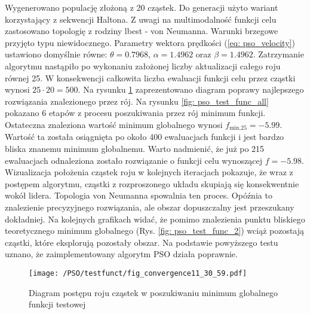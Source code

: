 Wygenerowano populację złożoną z 20 cząstek. Do generacji użyto wariant korzystający z sekwencji Haltona. Z uwagi na multimodalność funkcji celu zastosowano topologię z rodziny lbest - von Neumanna. Warunki brzegowe przyjęto typu niewidocznego. Parametry wektora prędkości (\ref{eq: pso_velocity}) ustawiono domyślnie równe: $\theta=0.7968$, $\alpha=1.4962$ oraz $\beta=1.4962$. Zatrzymanie algorytmu nastąpiło po wykonaniu założonej liczby aktualizacji całego roju równej 25. W konsekwencji całkowita liczba ewaluacji funkcji celu przez cząstki wynosi $25\cdot20=500$. Na rysunku \ref{fig: pso_convergence_plot} zaprezentowano diagram poprawy najlepszego rozwiązania znalezionego przez rój. Na rysunku \ref{fig: pso_test_func_all} pokazano 6 etapów z procesu poszukiwania przez rój minimum funkcji. Ostateczna znaleziona wartość minimum globalnego wynosi $f_{\text{min,25}}=-5.99$. Wartość ta została osiągnięta po około 400 ewaluacjach funkcji i jest bardzo bliska znanemu minimum globalnemu. Warto nadmienić, że już po 215 ewaluacjach odnaleziona zostało rozwiązanie o funkcji celu wynoszącej $f=-5.98$. Wizualizacja położenia cząstek roju w kolejnych iteracjach pokazuje, że wraz z postępem algorytmu, cząstki z rozproszonego układu skupiają się konsekwentnie wokół lidera. Topologia von Neumanna spowalnia ten proces. Opóźnia to znalezienie precyzyjnego rozwiązania, ale obszar dopuszczalny jest przeszukany dokładniej. Na kolejnych grafikach widać, że pomimo znalezienia punktu bliskiego teoretycznego minimum globalnego (Rys. \ref{fig: pso_test_func_2}) wciąż pozostają cząstki, które eksplorują pozostały obszar. Na podstawie powyższego testu uznano, że zaimplementowany algorytm PSO działa poprawnie.
\begin{figure}[h]
	\centering
	\texttt{[image: /PSO/testfunct/fig\_convergence11\_30\_59.pdf]} 
	\captionsetup{justification=centering}
	\caption{Diagram postępu roju cząstek w poszukiwaniu minimum globalnego funkcji testowej}
	\label{fig: pso_convergence_plot} 
\end{figure}

